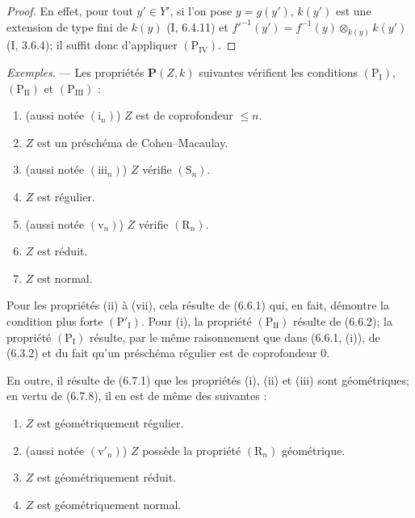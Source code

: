 \begin{proof}
En effet, pour tout $y'\in Y'$, si l'on pose $y=g(y')$, $k(y')$ est une
extension de type fini de $k(y)$ (I, 6.4.11) et
$f'^{-1}(y')=f^{-1}(y)\otimes_{k(y)}k(y')$ (I, 3.6.4); il suffit donc
d'appliquer $(\mathrm P_{\mathrm{IV}})$.
\end{proof}

\begin{env}[7.3.8]
\label{IV.2.s7.3.8-fr}
\emph{Exemples.} --- Les propriétés $\boldsymbol P(Z,k)$ suivantes
vérifient les conditions $(\mathrm P_{\mathrm I})$,
$(\mathrm P_{\mathrm{II}})$ et $(\mathrm P_{\mathrm{III}})$ :
\begin{enumerate}
\item[(i)] (aussi notée $(\mathrm i_n)$) $Z$ est de coprofondeur
$\leqslant n$.
\item[(ii)] $Z$ est un préschéma de Cohen--Macaulay.
\item[(iii)] (aussi notée $(\mathrm{iii}_n)$) $Z$ vérifie $(\mathrm S_n)$.
\item[(iv)] $Z$ est régulier.
\item[(v)] (aussi notée $(\mathrm v_n)$) $Z$ vérifie $(\mathrm R_n)$.
\item[(vi)] $Z$ est réduit.
\item[(vii)] $Z$ est normal.
\end{enumerate}
Pour les propriétés (ii) à (vii), cela résulte de (6.6.1) qui, en fait,
démontre la condition plus forte $(\mathrm P'_{\mathrm I})$. Pour (i), la
propriété $(\mathrm P_{\mathrm{II}})$ résulte de (6.6.2); la propriété
$(\mathrm P_{\mathrm I})$ résulte, par le même raisonnement que dans
(6.6.1, (i)), de (6.3.2) et du fait qu'un préschéma régulier est de
coprofondeur 0.

En outre, il résulte de (6.7.1) que les propriétés (i), (ii) et (iii) sont
géométriques; en vertu de (6.7.8), il en est de même des suivantes :
\begin{enumerate}
\item[(iv$'$)] $Z$ est géométriquement régulier.
\item[(v$'$)] (aussi notée $(\mathrm v'_n)$) $Z$ possède la propriété
$(\mathrm R_n)$ géométrique.
\item[(vi$'$)] $Z$ est géométriquement réduit.
\item[(vii$'$)] $Z$ est géométriquement normal.
\end{enumerate}
\end{env}

